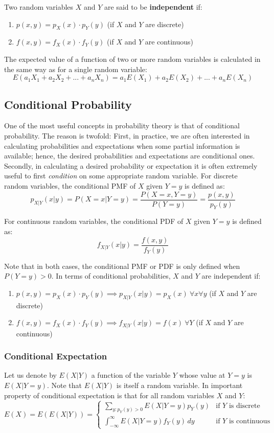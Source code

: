 \documentclass[12pt]{article}
\begin{document}
\noindent
Two random variables $X$ and $Y$ are said to be \textbf{independent} if:

\begin{enumerate}
    \item $p(x, y) = p_X(x) \cdot p_Y(y)$ (if $X$ and $Y$ are discrete)
    \item $f(x, y) = f_X(x) \cdot f_Y(y)$ (if $X$ and $Y$ are continuous)
\end{enumerate}

\noindent
The expected value of a function of two or more random variables is calculated in the same way as for a single random variable:
\[ E(a_1X_1 + a_2X_2 + ... + a_nX_n) = a_1E(X_1) + a_2E(X_2) + ... + a_nE(X_n) \]

\subsection{Conditional Probability}
One of the most useful concepts in probability theory is that of conditional probability.
The reason is twofold: First, in practice, we are often interested in calculating probabilities and expectations when some partial information is available; hence, the desired probabilities and expectations are conditional ones. 
Secondly, in calculating a desired probability or expectation it is often extremely useful to first \textit{condition} on some appropriate random variable.
For discrete random variables, the conditional PMF of $X$ given $Y = y$ is defined as:
\[ p_{X|Y}(x|y) = P(X = x | Y = y) = \frac{P(X = x, Y = y)}{P(Y = y)} = \frac{p(x, y)}{p_Y(y)} \]

\noindent
For continuous random variables, the conditional PDF of $X$ given $Y = y$ is defined as:
\[ f_{X | Y}(x | y) = \frac{f(x, y)}{f_Y(y)} \]

\noindent
Note that in both cases, the conditional PMF or PDF is only defined when $P(Y = y) > 0$.
In terms of conditional probabilities, $X$ and $Y$ are independent if:

\begin{enumerate}
    \item $p(x, y) = p_X(x) \cdot p_Y(y) \implies p_{X|Y}(x|y) = p_X(x) \ \forall x \forall y$ (if $X$ and $Y$ are discrete)
    \item $f(x, y) = f_X(x) \cdot f_Y(y) \implies f_{X|Y}(x|y) = f(x) \ \forall Y$ (if $X$ and $Y$ are continuous)
\end{enumerate}

\subsubsection{Conditional Expectation}
Let us denote by $E(X|Y)$ a function of the variable $Y$ whose value at $Y = y$ is $E(X | Y = y)$.
Note that $E(X|Y)$ is itself a random variable.
In important property of conditional expectation is that for all random variables $X$ and $Y$:
\[ E(X) = E(E(X|Y)) = \begin{cases}
    \displaystyle \sum_{y : p_Y(y) > 0} E(X|Y = y)p_Y(y) & \text{if } Y \text{ is discrete} \\
    \displaystyle \int_{-\infty}^{\infty} E(X|Y = y)f_Y(y) \,dy & \text{if } Y \text{ is continuous}
\end{cases} \]
\end{document}
